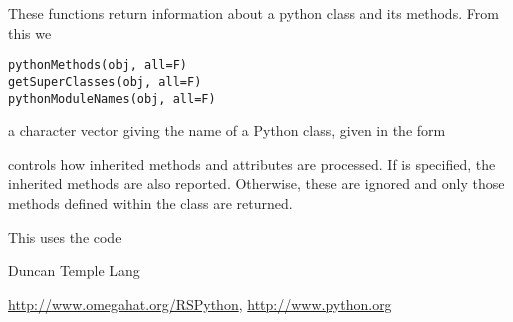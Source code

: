 \begin{Description}\relax
These functions return information about a python class
and its methods. From this we\end{Description}
\begin{Usage}
\begin{verbatim}
pythonMethods(obj, all=F)
getSuperClasses(obj, all=F)
pythonModuleNames(obj, all=F)
\end{verbatim}
\end{Usage}
\begin{Arguments}
\begin{ldescription}
\item[\code{obj}] a character vector giving the name of a Python class,
given in the form 
\item[\code{all}] controls how inherited methods and attributes are
processed. If  is specified, the inherited methods are
also reported. Otherwise, these are ignored and only those methods
defined within the class are returned.
\end{ldescription}
\end{Arguments}
\begin{Details}\relax
This uses the code\end{Details}
\begin{Value}
\end{Value}
\begin{Author}\relax
Duncan Temple Lang\end{Author}
\begin{References}\relax
\url{http://www.omegahat.org/RSPython},
\url{http://www.python.org}\end{References}
\begin{SeeAlso}\relax
\end{SeeAlso}
\begin{Examples}
\begin{ExampleCode}

\end{ExampleCode}
\end{Examples}

